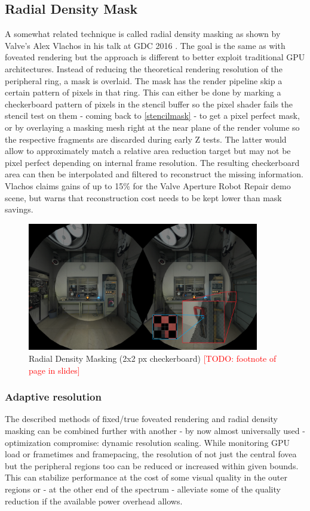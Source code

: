 \subsection{Radial Density Mask}
A somewhat related technique is called radial density masking as shown by Valve's Alex Vlachos in his talk at GDC 2016 \cite{Vlachos.2016c}. The goal is the same as with foveated rendering but the approach is different to better exploit traditional GPU architectures. Instead of reducing the theoretical rendering resolution of the peripheral ring, a mask is overlaid. The mask has the render pipeline skip a certain pattern of pixels in that ring. This can either be done by marking a checkerboard pattern of pixels in the stencil buffer so the pixel shader fails the stencil test on them - coming back to \autoref{stencilmask} - to get a pixel perfect mask, or by overlaying a masking mesh right at the near plane of the render volume so the respective fragments are discarded during early Z tests. The latter would allow to approximately match a relative area reduction target but may not be pixel perfect depending on internal frame resolution. The resulting checkerboard area can then be interpolated and filtered to reconstruct the missing information. Vlachos claims gains of up to 15\% for the Valve Aperture Robot Repair demo scene, but warns that reconstruction cost needs to be kept lower than mask savings. 

\begin{figure}[!htb]
  \centering
  \includegraphics[width=0.9\textwidth]{pictures/vlachos_RDM}
  \caption{Radial Density Masking (2x2 px checkerboard)\cite{Vlachos.2016c} \textcolor{red}{[TODO: footnote of page in slides]}} \label{fig:vlachos_RDM}
\end{figure} 

\subsubsection{Adaptive resolution}
The described methods of fixed/true foveated rendering and radial density masking can be combined further with another - by now almost universally used - optimization compromise: dynamic resolution scaling. While monitoring GPU load or frametimes and framepacing, the resolution of not just the central fovea but the peripheral regions too can be reduced or increased within given bounds. This can stabilize performance at the cost of some visual quality in the outer regions or - at the other end of the spectrum - alleviate some of the quality reduction if the available power overhead allows. 

